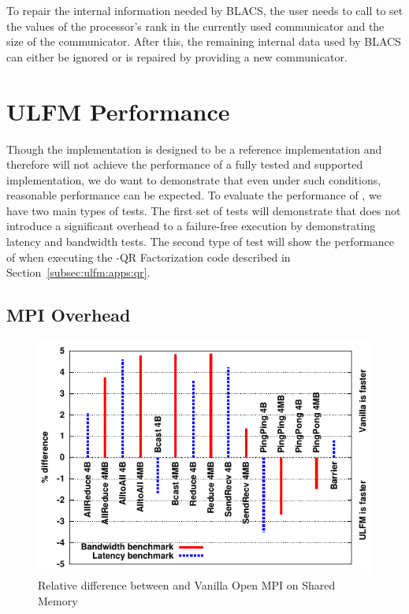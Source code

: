 To repair the internal information needed by BLACS, the user needs to call 
 to set the values of the processor's rank in the currently used
communicator and the size of the communicator. After this, the remaining internal data
used by BLACS can either be ignored or is repaired by providing a new communicator.

\section{ULFM Performance}
\label{sec:ulfm:performance}

Though the \ulfm implementation is designed to be a reference implementation and 
therefore will not achieve the performance of a fully tested and supported \mpi 
implementation, we do want to demonstrate that even under such conditions, 
reasonable performance can be expected. To evaluate the performance of \ulfm, we 
have two main types of tests. The first set of tests will demonstrate that \ulfm 
does not introduce a significant overhead to a failure-free execution by 
demonstrating latency and bandwidth tests. The second type of test will show the 
performance of \ulfm when executing the \abft-QR Factorization code described in 
Section~\ref{subsec:ulfm:apps:qr}.

\subsection{MPI Overhead}
\label{subsec:ulfm:performance:overhead}

\begin{figure}[t]
    \centering
    \includegraphics[width=.8\linewidth]{figures/IMB}
    \caption{Relative difference between \ulfm and Vanilla Open MPI on Shared Memory}
    \label{fig:ulfm:imb}
\end{figure}

